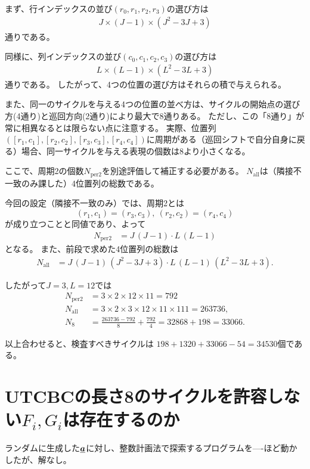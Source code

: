 \documentclass[a4paper,11pt,dvipdfmx]{jsarticle}
\theoremstyle{definition}
\begin{document}
まず、行インデックスの並び$(r_0,r_1,r_2,r_3)$の選び方は
\begin{align}
  J\times (J-1)\times \left(J^2-3J+3\right)
\end{align}
通りである。  

同様に、列インデックスの並び$(c_0,c_1,c_2,c_3)$の選び方は
\begin{align}
  L\times (L-1)\times \left(L^2-3L+3\right)
\end{align}
通りである。
したがって、4つの位置の選び方はそれらの積で与えられる。

また、同一のサイクルを与える4つの位置の並べ方は、サイクルの開始点の選び方(4通り)と巡回方向(2通り)により最大で$8$通りある。
ただし、この「$8$通り」が常に相異なるとは限らない点に注意する。
実際、位置列$([r_1,c_1],[r_2,c_2],[r_3,c_3],[r_4,c_4])$に周期がある（巡回シフトで自分自身に戻る）場合、同一サイクルを与える表現の個数は$8$より小さくなる。

ここで、周期2の個数$N_{\mathrm{per2}}$を別途評価して補正する必要がある。
$N_{\mathrm{all}}$は（隣接不一致のみ課した）4位置列の総数である。

今回の設定（隣接不一致のみ）では、周期2とは
\[(r_1,c_1)=(r_3,c_3),\ (r_2,c_2)=(r_4,c_4)\]
が成り立つことと同値であり、よって
\begin{align}
  N_{\mathrm{per2}} &= J\,(J-1)\cdot L\,(L-1)
\end{align}
となる。
また、前段で求めた4位置列の総数は
\begin{align}
  N_{\mathrm{all}} &= J\,(J-1)\,\left(J^2-3J+3\right)\cdot L\,(L-1)\,\left(L^2-3L+3\right).
\end{align}

したがって$J=3, L=12$では
\begin{align}
  N_{\mathrm{per2}} &= 3\times2\times12\times11 = 792\\
  N_{\mathrm{all}} &= 3\times 2\times 3\times 12\times 11\times 111 = 263736,\\
  N_8 &= \frac{263736-792}{8}+\frac{792}{4} = 32868 + 198 = 33066.
\end{align}

以上合わせると、検査すべきサイクルは
$198+1320+33066 - 54 = 34530$個である。

\section{UTCBCの長さ8のサイクルを許容しない$F_i, G_i$は存在するのか}
ランダムに生成した$\underline{\bm{a}}$に対し、整数計画法で探索するプログラムを----ほど動かしたが、解なし。
\end{document}
